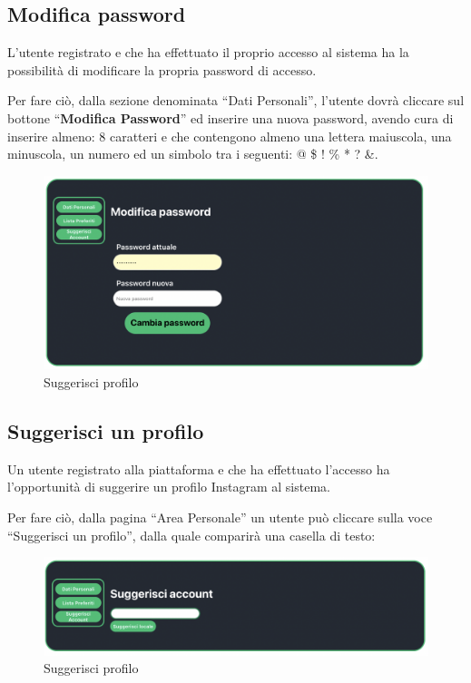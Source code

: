 \subsection{Modifica password}

L’utente registrato e che ha effettuato il proprio accesso al sistema ha la possibilità di modificare la propria password di accesso.

Per fare ciò, dalla sezione denominata “Dati Personali”, l'utente dovrà cliccare sul bottone “\textbf{Modifica Password}” ed inserire una nuova password, avendo cura di inserire almeno: 8 caratteri e che contengono almeno una lettera maiuscola, una minuscola, un numero ed un simbolo tra i seguenti: @ \$ ! \% * ? \&{}.

\begin{figure}[H]
\centering
\includegraphics[scale=0.4]{./images/AreaPersonale/CambiaPassword.png} 
\caption{Suggerisci profilo}
\end{figure}

\subsection{Suggerisci un profilo}

Un utente registrato alla piattaforma e che ha effettuato l’accesso ha l’opportunità di suggerire un profilo Instagram al sistema.

Per fare ciò, dalla pagina “Area Personale” un utente può cliccare sulla voce “Suggerisci un profilo”, dalla quale comparirà una casella di testo:

\begin{figure}[H]
\centering
\includegraphics[scale=0.4]{./images/AreaPersonale/SuggerisciAccount.png} 
\caption{Suggerisci profilo}
\end{figure}


